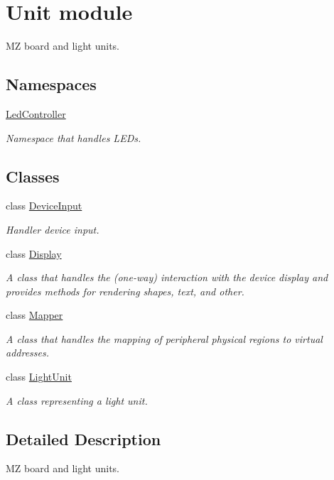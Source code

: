 \hypertarget{group__unit}{}\section{Unit module}
\label{group__unit}


MZ board and light units.  


\subsection*{Namespaces}
\begin{DoxyCompactItemize}
\item 
 \mbox{\hyperlink{namespaceLedController}{Led\+Controller}}
\begin{DoxyCompactList}\small\item\em Namespace that handles L\+E\+Ds. \end{DoxyCompactList}\end{DoxyCompactItemize}
\subsection*{Classes}
\begin{DoxyCompactItemize}
\item 
class \mbox{\hyperlink{classDeviceInput}{Device\+Input}}
\begin{DoxyCompactList}\small\item\em Handler device input. \end{DoxyCompactList}\item 
class \mbox{\hyperlink{classDisplay}{Display}}
\begin{DoxyCompactList}\small\item\em A class that handles the (one-\/way) interaction with the device display and provides methods for rendering shapes, text, and other. \end{DoxyCompactList}\item 
class \mbox{\hyperlink{classMapper}{Mapper}}
\begin{DoxyCompactList}\small\item\em A class that handles the mapping of peripheral physical regions to virtual addresses. \end{DoxyCompactList}\item 
class \mbox{\hyperlink{classLightUnit}{Light\+Unit}}
\begin{DoxyCompactList}\small\item\em A class representing a light unit. \end{DoxyCompactList}\end{DoxyCompactItemize}


\subsection{Detailed Description}
MZ board and light units. 

